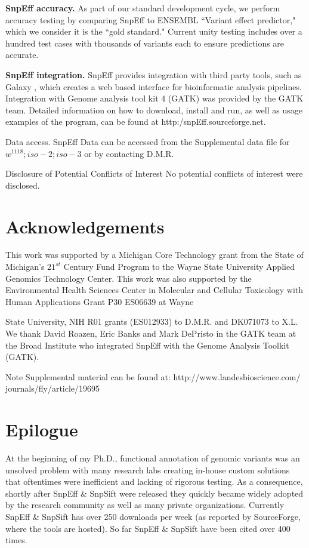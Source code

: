 \textbf{SnpEff accuracy.} As part of our standard development cycle, we perform accuracy testing by comparing SnpEff to ENSEMBL ``Variant effect predictor," which we consider it is the ``gold standard." Current unity testing includes over a hundred test cases with thousands of variants each to ensure predictions are accurate.

\textbf{SnpEff integration.} SnpEff provides integration with third party tools, such as Galaxy \cite{giardine2005galaxy}, which creates a web based interface for bioinformatic analysis pipelines.  Integration with Genome analysis tool kit 4 (GATK) was provided by the GATK team.  Detailed information on how to download, install and run, as well as usage examples of the program, can be found at http:/snpEff.sourceforge.net.  

Data access. SnpEff Data can be accessed from the Supplemental data file for $w^{1118} ; iso-2; iso-3$ or by contacting D.M.R.

Disclosure of Potential Conflicts of Interest No potential conflicts of interest were disclosed.


\section{Acknowledgements}

This work was supported by a Michigan Core Technology grant from the State of Michigan’s $21^{st}$ Century Fund Program to the Wayne State University Applied Genomics Technology Center. This work was also supported by the Environmental Health Sciences Center in Molecular and Cellular Toxicology with Human Applications Grant P30 ES06639 at Wayne

State University, NIH R01 grants (ES012933) to D.M.R. and DK071073 to X.L. We thank David Roazen, Eric Banks and Mark DePristo in the GATK team at the Broad Institute who integrated SnpEff with the Genome Analysis Toolkit (GATK).

Note Supplemental material can be found at: http://www.landesbioscience.com/ journals/fly/article/19695

\section{Epilogue}

At the beginning of my Ph.D., functional annotation of genomic variants was an unsolved problem with many research labs creating in-house custom solutions that oftentimes were inefficient and lacking of rigorous testing. As a consequence, shortly after SnpEff \& SnpSift were released they quickly became widely adopted by the research community as well as many private organizations. Currently SnpEff \& SnpSift has over 250 downloads per week (as reported by  SourceForge, where the tools are hosted). So far SnpEff \& SnpSift  have been cited over 400 times.

